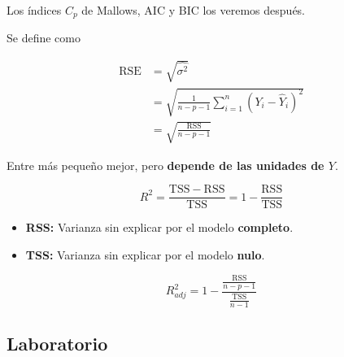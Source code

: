 \documentclass[
  12pt,
]{book}
\providecommand{\tightlist}{%
  \setlength{\itemsep}{0pt}\setlength{\parskip}{0pt}}
\theoremstyle{definition}
\theoremstyle{definition}
\theoremstyle{definition}
\theoremstyle{remark}
\begin{document}
Los índices \(C_{p}\) de Mallows, AIC y BIC los veremos después.

\begin{description}
\tightlist
\item[Error estándar residual]
Se define como
\end{description}

\begin{align*}
\mathrm{RSE} 
&=  \sqrt{\hat{\sigma^{2}}}\\
&= \sqrt{\frac{1}{n-p-1} \sum_{i=1}^{n} \left( Y_{i} - \hat{Y}_{i}\right)^{2}} \\
&= \sqrt{\frac{\mathrm{RSS}}{n-p-1}}
\end{align*}

Entre más pequeño mejor, pero \textbf{depende de las unidades de \(Y\)}.

\begin{description}
\tightlist
\item[Estadístico \(R^{2}\)]
\begin{equation*}
R^{2} = \frac{\mathrm{TSS}-\mathrm{RSS}}{\mathrm{TSS}} = 1-\frac{\mathrm{RSS}}{\mathrm{TSS}}
\end{equation*}
\end{description}

\begin{itemize}
\tightlist
\item
  \textbf{RSS:} Varianza sin explicar por el modelo \textbf{completo}.
\item
  \textbf{TSS:} Varianza sin explicar por el modelo \textbf{nulo}.
\end{itemize}

\begin{description}
\tightlist
\item[Estadístico \(R^{2}\) ajustado]
\begin{equation*}
R^{2}_{adj} = 1-\frac{\frac{\mathrm{RSS}}{n-p-1}}{\frac{\mathrm{TSS}}{n-1}}
\end{equation*}
\end{description}

\hypertarget{laboratorio-3}{%
\subsection{Laboratorio}\label{laboratorio-3}}
\end{document}
